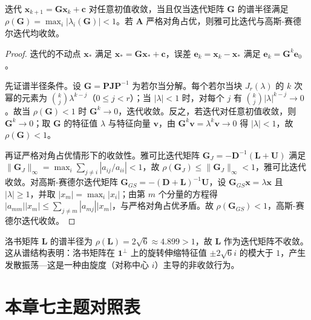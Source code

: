 \begin{theorem}[迭代收敛的充要条件]\label{thm:iteration_convergence}
迭代 $\mathbf{x}_{k+1} = \mathbf{G} \mathbf{x}_k + \mathbf{c}$ 对任意初值收敛，当且仅当迭代矩阵 $\mathbf{G}$ 的谱半径满足 $\rho(\mathbf{G}) = \max_i |\lambda_i(\mathbf{G})| < 1$。若 $\mathbf{A}$ 严格对角占优，则雅可比迭代与高斯-赛德尔迭代均收敛。
\end{theorem}

\begin{proof}
迭代的不动点 $\mathbf{x}_*$ 满足 $\mathbf{x}_* = \mathbf{G}\mathbf{x}_* + \mathbf{c}$，误差 $\mathbf{e}_k = \mathbf{x}_k - \mathbf{x}_*$ 满足 $\mathbf{e}_k = \mathbf{G}^k \mathbf{e}_0$。

先证谱半径条件。设 $\mathbf{G} = \mathbf{P}\mathbf{J}\mathbf{P}^{-1}$ 为若尔当分解。每个若尔当块 $J_r(\lambda)$ 的 $k$ 次幂的元素为 $\binom{k}{j}\lambda^{k-j}$（$0 \le j < r$）；当 $|\lambda| < 1$ 时，对每个 $j$ 有 $\binom{k}{j}|\lambda|^{k-j} \to 0$。故当 $\rho(\mathbf{G}) < 1$ 时 $\mathbf{G}^k \to 0$，迭代收敛。反之，若迭代对任意初值收敛，则 $\mathbf{G}^k \to 0$；取 $\mathbf{G}$ 的特征值 $\lambda$ 与特征向量 $\mathbf{v}$，由 $\mathbf{G}^k\mathbf{v} = \lambda^k\mathbf{v} \to 0$ 得 $|\lambda| < 1$，故 $\rho(\mathbf{G}) < 1$。

再证严格对角占优情形下的收敛性。雅可比迭代矩阵 $\mathbf{G}_J = -\mathbf{D}^{-1}(\mathbf{L}+\mathbf{U})$ 满足 $\|\mathbf{G}_J\|_\infty = \max_i \sum_{j \neq i}|a_{ij}/a_{ii}| < 1$，故 $\rho(\mathbf{G}_J) \le \|\mathbf{G}_J\|_\infty < 1$，雅可比迭代收敛。对高斯-赛德尔迭代矩阵 $\mathbf{G}_{GS} = -(\mathbf{D}+\mathbf{L})^{-1}\mathbf{U}$，设 $\mathbf{G}_{GS}\mathbf{x} = \lambda\mathbf{x}$ 且 $|\lambda| \ge 1$，并取 $|x_m| = \max_i |x_i|$；由第 $m$ 个分量的方程得 $|a_{mm}||x_m| \le \sum_{j\neq m}|a_{mj}||x_m|$，与严格对角占优矛盾。故 $\rho(\mathbf{G}_{GS}) < 1$，高斯-赛德尔迭代收敛。
\end{proof}

\begin{remark}[洛书矩阵与迭代法的比较]\label{rem:luoshu_iteration}
洛书矩阵 $\mathbf{L}$ 的谱半径为 $\rho(\mathbf{L}) = 2\sqrt{6} \approx 4.899 > 1$，故 $\mathbf{L}$ 作为迭代矩阵不收敛。这从谱结构表明：洛书矩阵在 $\mathbf{1}^\perp$ 上的旋转伸缩特征值 $\pm 2\sqrt{6}i$ 的模大于 $1$，产生发散振荡---这是一种由旋度（对称中心 $i$）主导的非收敛行为。
\end{remark}

\section*{本章七主题对照表}


